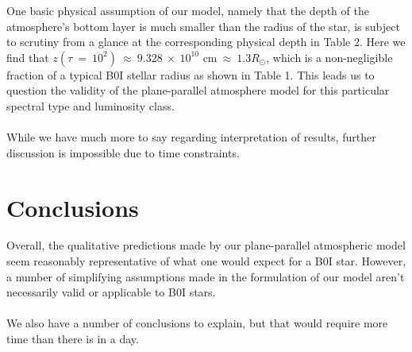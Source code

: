 \documentclass[iop,revtex4]{emulateapj}
\begin{document}
\par
One basic physical assumption of our model, namely that the depth of the atmosphere's bottom layer is much smaller than the radius of the star, is subject to scrutiny from a glance at the corresponding physical depth in Table 2. Here we find that $z(\tau~=~10^{2})~\approx~9.328~\times~10^{10}\text{ cm}~\approx~1.3R_{\odot}$, which is a non-negligible fraction of a typical B0I stellar radius as shown in Table 1. This leads us to question the validity of the plane-parallel atmosphere model for this particular spectral type and luminosity class. \\ \\

While we have much more to say regarding interpretation of results, further discussion is impossible due to time constraints.   \\

\section{Conclusions} \label{conclusions}

Overall, the qualitative predictions made by our plane-parallel atmospheric model seem reasonably representative of what one would expect for a B0I star. However, a number of simplifying assumptions made in the formulation of our model aren't necessarily valid or applicable to B0I stars. \\ \\

We also have a number of conclusions to explain, but that would require more time than there is in a day.



\end{document}
